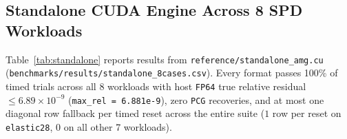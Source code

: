 \documentclass[10pt]{article}
\begin{document}
\begin{table}[t]
\caption{Per-engine GPU benchmark protocol (AmgX driver: \texttt{benchmarks/baselines/bench\_amgx.cu}, fork \url{https://github.com/bbopen/AMGX} \texttt{bitfsai-smoother} @ \texttt{8f289e5}; LLNL \texttt{hypre}~3.2.1+ \texttt{master} @ \texttt{1da70df}, 4 commits past \texttt{v3.2.1}; Ginkgo~\texttt{develop} snapshot \texttt{2.0.0-dev} @ \texttt{796a388}, ahead of \texttt{v1.11.0}). Neither GPU engine uses Theorem~5's host damping certificate during timed runs (\texttt{standalone\_amg} uses $\omega = 0.65/0.35$; AmgX uses $\omega = 0.72$). \texttt{standalone\_amg}, \texttt{hypre}, and Ginkgo set inner 2-norm tolerance $7\times 10^{-9}$, whereas \texttt{bench\_amgx.cu} sets $8\times 10^{-9}$ (slightly looser by $1.14\times$, at most a fraction of an iteration); every passing timed trial across all four engines clears the identical independent host CPU \texttt{FP64} true Euclidean 2-norm gate $\|b - A x\|_2 / \|b\|_2 \le 10^{-8}$ (max $7.87\times 10^{-9}$; \texttt{INT4-spl} max $7.854\times 10^{-9}$). Synthetic 3D PDEs refresh material coefficients (\texttt{step=0 -> step=2}) on a fixed CSR pattern; SuiteSparse matrices replay unchanged (\texttt{rail\_79841} negated to SPD \texttt{rail\_79841\_neg.mtx} via \texttt{benchmarks/baselines/prepare\_mtx.py}).}
\label{tab:protocol}
\end{table}

\subsection{Standalone CUDA Engine Across 8 SPD Workloads}\label{sec:standalone}
Table~\ref{tab:standalone} reports results from \texttt{reference/standalone\_amg.cu} (\texttt{benchmarks/results/standalone\_8cases.csv}). Every format passes 100\% of timed trials across all 8 workloads with host \texttt{FP64} true relative residual $\le 6.89\times 10^{-9}$ (\texttt{max\_rel = 6.881e-9}), zero \texttt{PCG} recoveries, and at most one diagonal row fallback per timed reset across the entire suite ($1$ row per reset on \texttt{elastic28}, $0$ on all other 7 workloads).
\end{document}
